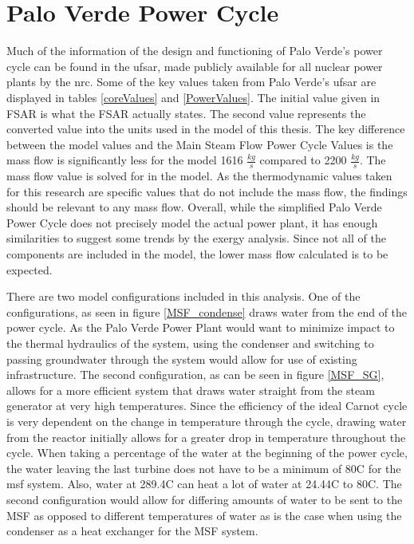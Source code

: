 \section{Palo Verde Power Cycle}

Much of the information of the design and functioning of Palo Verde's power cycle can be found in the \ac{ufsar}, made publicly available for all nuclear power plants by the \ac{nrc}. Some of the key values taken from Palo Verde's \ac{ufsar} are displayed in tables \ref{coreValues} and \ref{PowerValues}. The initial value given in FSAR is what the FSAR actually states.  The second value represents the converted value into the units used in the model of this thesis.  The key difference between the model values and the Main Steam Flow Power Cycle Values is the mass flow is significantly less for the model 1616 $\frac{kg}{s}$ compared to 2200 $\frac{kg}{s}$. The mass flow value is solved for in the model. As the thermodynamic values taken for this research are specific values that do not include the mass flow, the findings should be relevant to any mass flow. Overall, while the simplified Palo Verde Power Cycle does not precisely model the actual power plant, it has enough similarities to suggest some trends by the exergy analysis. Since not all of the components are included in the model, the lower mass flow calculated is to be expected. 
% 
% 

There are two model configurations included in this analysis.  One of the configurations, as seen in figure \ref{MSF_condense}  draws water from the end of the power cycle.  As the Palo Verde Power Plant would want to minimize impact to the thermal hydraulics of the system, using the condenser and switching to passing groundwater through the system would allow for use of existing infrastructure. The second configuration, as can be seen in figure \ref{MSF_SG}, allows for a more efficient system that draws water straight from the steam generator at very high temperatures. Since the efficiency of the ideal Carnot cycle is very dependent on the change in temperature through the cycle, drawing water from the reactor initially allows for a greater drop in temperature throughout the cycle.  When taking a percentage of the water at the beginning of the power cycle, the water leaving the last turbine does not have to be a minimum of 80\degree C for the \ac{msf} system.  Also, water at 289.4\degree C can heat a lot of water at 24.44\degree C to 80\degree C. The second configuration would allow for differing amounts of water to be sent to the MSF as opposed to different temperatures of water as is the case when using the condenser as a heat exchanger for the MSF system.

